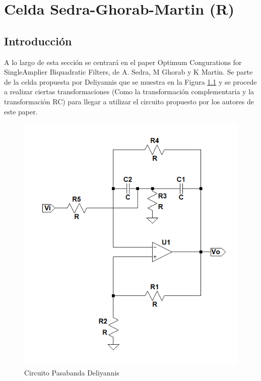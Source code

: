 \chapter{Celda Sedra-Ghorab-Martin (R)}

\section{Introducción}

A lo largo de esta sección se centrará en el paper Optimum Congurations
for SingleAmplier Biquadratic Filters, de A. Sedra, M Ghorab y K Martin.
Se parte de la celda propuesta por Deliyannis que se muestra en la
Figura \ref{3_1} y se procede a realizar ciertas transformaciones
(Como la transformación complementaria y la transformación RC) para
llegar a utilizar el circuito propuesto por los autores de este paper.

\begin{figure}[H]
\begin{centering}
\includegraphics[scale=0.5]{Resources/Deliyannis}
\par\end{centering}
\caption{Circuito Pasabanda Deliyannis}
\label{3_1}

\end{figure}

